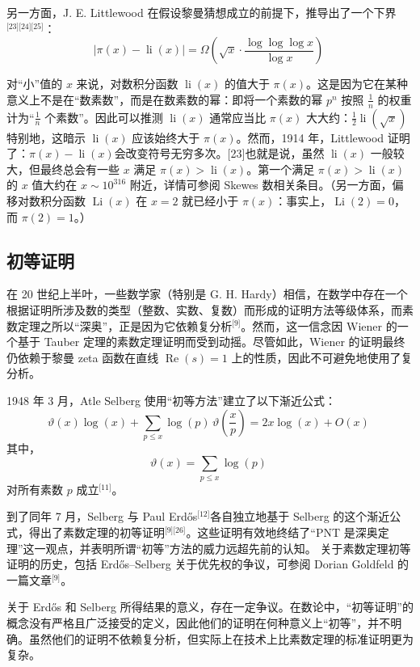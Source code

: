 另一方面，J. E. Littlewood 在假设黎曼猜想成立的前提下，推导出了一个下界\(^\text{[23][24][25]}\)：
$$
\left| \pi(x) - \operatorname{li}(x) \right| = \Omega\left( \sqrt{x} \cdot \frac{\log \log \log x}{\log x} \right)~
$$

对“小”值的 $x$ 来说，对数积分函数 $\operatorname{li}(x)$ 的值大于 $\pi(x)$。这是因为它在某种意义上不是在“数素数”，而是在数素数的幂：即将一个素数的幂 $p^n$ 按照 $\frac{1}{n}$ 的权重计为“$\frac{1}{n}$ 个素数”。因此可以推测 $\operatorname{li}(x)$ 通常应当比 $\pi(x)$ 大大约：$\frac{1}{2} \operatorname{li}(\sqrt{x})$特别地，这暗示 $\operatorname{li}(x)$ 应该始终大于 $\pi(x)$。然而，1914 年，Littlewood 证明了：$\pi(x) - \operatorname{li}(x)$会改变符号无穷多次。[23]也就是说，虽然 $\operatorname{li}(x)$ 一般较大，但最终总会有一些 $x$ 满足 $\pi(x) > \operatorname{li}(x)$。第一个满足 $\pi(x) > \operatorname{li}(x)$ 的 $x$ 值大约在 $x \sim 10^{316}$ 附近，详情可参阅 Skewes 数相关条目。（另一方面，偏移对数积分函数 $\operatorname{Li}(x)$ 在 $x = 2$ 就已经小于 $\pi(x)$：事实上，$\operatorname{Li}(2) = 0$，而 $\pi(2) = 1$。）
\subsection{初等证明}
在 20 世纪上半叶，一些数学家（特别是 G. H. Hardy）相信，在数学中存在一个根据证明所涉及数的类型（整数、实数、复数）而形成的证明方法等级体系，而素数定理之所以“深奥”，正是因为它依赖复分析\(^\text{[9]}\)。然而，这一信念因 Wiener 的一个基于 Tauber 定理的素数定理证明而受到动摇。尽管如此，Wiener 的证明最终仍依赖于黎曼 zeta 函数在直线 $\operatorname{Re}(s) = 1$ 上的性质，因此不可避免地使用了复分析。

1948 年 3 月，Atle Selberg 使用“初等方法”建立了以下渐近公式：
$$
\vartheta(x)\log(x) + \sum_{p \leq x} \log(p) \, \vartheta\left(\frac{x}{p}\right) = 2x\log(x) + O(x)~
$$
其中，
$$
\vartheta(x) = \sum_{p \leq x} \log(p)~
$$
对所有素数 $p$ 成立\(^\text{[11]}\)。

到了同年 7 月，Selberg 与 Paul Erdős\(^\text{[12]}\)各自独立地基于 Selberg 的这个渐近公式，得出了素数定理的初等证明\(^\text{[9][26]}\)。这些证明有效地终结了“PNT 是深奥定理”这一观点，并表明所谓“初等”方法的威力远超先前的认知。
关于素数定理初等证明的历史，包括 Erdős–Selberg 关于优先权的争议，可参阅 Dorian Goldfeld 的一篇文章\(^\text{[9]}\)。

关于 Erdős 和 Selberg 所得结果的意义，存在一定争议。在数论中，“初等证明”的概念没有严格且广泛接受的定义，因此他们的证明在何种意义上“初等”，并不明确。虽然他们的证明不依赖复分析，但实际上在技术上比素数定理的标准证明更为复杂。

